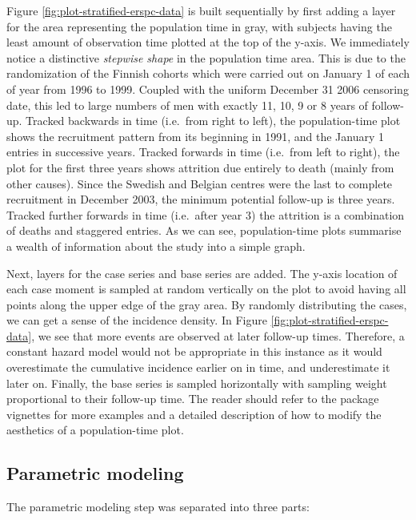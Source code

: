 Figure \ref{fig:plot-stratified-erspc-data} is built sequentially by
first adding a layer for the area representing the population time in
gray, with subjects having the least amount of observation time plotted
at the top of the y-axis. We immediately notice a distinctive
\emph{stepwise shape} in the population time area. This is due to the
randomization of the Finnish cohorts which were carried out on January 1
of each of year from 1996 to 1999. Coupled with the uniform December 31
2006 censoring date, this led to large numbers of men with exactly 11,
10, 9 or 8 years of follow-up. Tracked backwards in time (i.e.~from
right to left), the population-time plot shows the recruitment pattern
from its beginning in 1991, and the January 1 entries in successive
years. Tracked forwards in time (i.e.~from left to right), the plot for
the first three years shows attrition due entirely to death (mainly from
other causes). Since the Swedish and Belgian centres were the last to
complete recruitment in December 2003, the minimum potential follow-up
is three years. Tracked further forwards in time (i.e.~after year 3) the
attrition is a combination of deaths and staggered entries. As we can
see, population-time plots summarise a wealth of information about the
study into a simple graph.

Next, layers for the case series and base series are added. The y-axis
location of each case moment is sampled at random vertically on the plot
to avoid having all points along the upper edge of the gray area. By
randomly distributing the cases, we can get a sense of the incidence
density. In Figure \ref{fig:plot-stratified-erspc-data}, we see that
more events are observed at later follow-up times. Therefore, a constant
hazard model would not be appropriate in this instance as it would
overestimate the cumulative incidence earlier on in time, and
underestimate it later on. Finally, the base series is sampled
horizontally with sampling weight proportional to their follow-up time.
The reader should refer to the package vignettes for more examples and a
detailed description of how to modify the aesthetics of a
population-time plot.

\hypertarget{parametric-modeling}{%
\subsection{Parametric modeling}\label{parametric-modeling}}

The parametric modeling step was separated into three parts:

